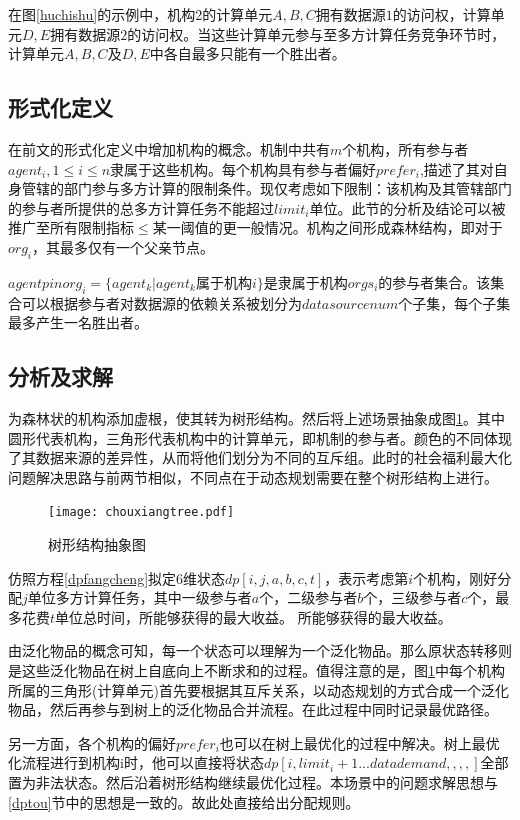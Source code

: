 \documentclass[promaster]{thesis-uestc}
\begin{document}
在图\ref{huchishu}的示例中，机构2的计算单元$A,B,C$拥有数据源$1$的访问权，计算单元$D,E$拥有数据源$2$的访问权。当这些计算单元参与至多方计算任务竞争环节时，计算单元$A,B,C$及$D,E$中各自最多只能有一个胜出者。
\subsection{形式化定义}

在前文的形式化定义中增加机构的概念。机制中共有$m$个机构，所有参与者$agent_i,1 \leq i \leq n$隶属于这些机构。每个机构具有参与者偏好$prefer_i$,描述了其对自身管辖的部门参与多方计算的限制条件。现仅考虑如下限制：该机构及其管辖部门的参与者所提供的总多方计算任务不能超过$limit_i$单位。此节的分析及结论可以被推广至所有限制指标$\leq$某一阈值的更一般情况。机构之间形成森林结构，即对于$org_i$，其最多仅有一个父亲节点。

$agentpinorg_i=\{agent_k|agent_k属于机构i\}$是隶属于机构$orgs_i$的参与者集合。该集合可以根据参与者对数据源的依赖关系被划分为$datasourcenum$个子集，每个子集最多产生一名胜出者。

\subsection{分析及求解}
为森林状的机构添加虚根，使其转为树形结构。然后将上述场景抽象成图\ref{chouxiangtree}。其中圆形代表机构，三角形代表机构中的计算单元，即机制的参与者。颜色的不同体现了其数据来源的差异性，从而将他们划分为不同的互斥组。此时的社会福利最大化问题解决思路与前两节相似，不同点在于动态规划需要在整个树形结构上进行。

\begin{figure}[h]
    \texttt{[image: chouxiangtree.pdf]}
    \caption{树形结构抽象图}
    \label{chouxiangtree}
\end{figure}

仿照方程\ref{dpfangcheng}拟定6维状态$dp[i,j,a,b,c,t]$，表示考虑第$i$个机构，刚好分配$j$单位多方计算任务，其中一级参与者$a$个，二级参与者$b$个，三级参与者$c$个，最多花费$t$单位总时间，所能够获得的最大收益。
所能够获得的最大收益。

由泛化物品的概念可知，每一个状态可以理解为一个泛化物品。那么原状态转移则是这些泛化物品在树上自底向上不断求和的过程。值得注意的是，图\ref{chouxiangtree}中每个机构所属的三角形(计算单元)首先要根据其互斥关系，以动态规划的方式合成一个泛化物品，然后再参与到树上的泛化物品合并流程。在此过程中同时记录最优路径。

另一方面，各个机构的偏好$prefer_i$也可以在树上最优化的过程中解决。树上最优化流程进行到机构i时，他可以直接将状态$dp[i,limit_i+1...datademand,,,,]$全部置为非法状态。然后沿着树形结构继续最优化过程。本场景中的问题求解思想与\ref{dptou}节中的思想是一致的。故此处直接给出分配规则。
\end{document}
